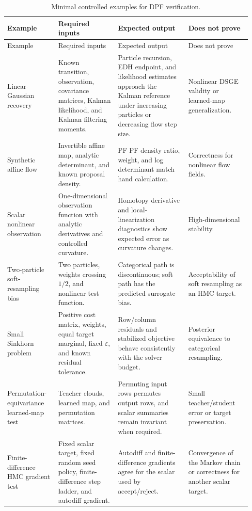 \begin{longtable}{@{}p{} p{} p{} p{}@{}}
\caption{Minimal controlled examples for DPF verification.}
\label{tab:bf-dpf-debug-controlled-examples}\\
\toprule
Example & Required inputs & Expected output & Does not prove \\
\midrule
\endfirsthead
\toprule
Example & Required inputs & Expected output & Does not prove \\
\midrule
\endhead
Linear-Gaussian recovery &
Known transition, observation, covariance matrices, Kalman likelihood, and
Kalman filtering moments. &
Particle recursion, EDH endpoint, and likelihood estimates approach the Kalman
reference under increasing particles or decreasing flow step size. &
Nonlinear DSGE validity or learned-map generalization. \\
Synthetic affine flow &
Invertible affine map, analytic determinant, and known proposal density. &
PF-PF density ratio, weight, and log determinant match hand calculation. &
Correctness for nonlinear flow fields. \\
Scalar nonlinear observation &
One-dimensional observation function with analytic derivatives and controlled
curvature. &
Homotopy derivative and local-linearization diagnostics show expected error as
curvature changes. &
High-dimensional stability. \\
Two-particle soft-resampling bias &
Two particles, weights crossing $1/2$, and nonlinear test function. &
Categorical path is discontinuous; soft path has the predicted surrogate bias. &
Acceptability of soft resampling as an HMC target. \\
Small Sinkhorn problem &
Positive cost matrix, weights, equal target marginal, fixed $\varepsilon$, and
known residual tolerance. &
Row/column residuals and stabilized objective behave consistently with the
solver budget. &
Posterior equivalence to categorical resampling. \\
Permutation-equivariance learned-map test &
Teacher clouds, learned map, and permutation matrices. &
Permuting input rows permutes output rows, and scalar summaries remain
invariant when required. &
Small teacher/student error or target preservation. \\
Finite-difference HMC gradient test &
Fixed scalar target, fixed random seed policy, finite-difference step ladder,
and autodiff gradient. &
Autodiff and finite-difference gradients agree for the scalar used by
accept/reject. &
Convergence of the Markov chain or correctness for another scalar target. \\
\bottomrule
\end{longtable}

